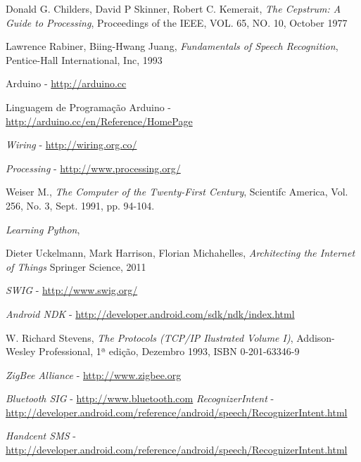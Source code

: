 \documentclass[12pt,a4paper,oneside]{report}
\begin{document}
\begin{thebibliography}{99}
	Donald G. Childers, David P Skinner, Robert C. Kemerait,
	\emph{The Cepstrum: A Guide to Processing}, 
	Proceedings of the IEEE, VOL. 65, NO. 10, October 1977

	Lawrence Rabiner, Biing-Hwang Juang,
	\emph{Fundamentals of Speech Recognition},
	Pentice-Hall International, Inc, 1993

	Arduino - \url{http://arduino.cc}
    
	Linguagem de Programação Arduino - \url{http://arduino.cc/en/Reference/HomePage}

	\emph{Wiring} - \url{http://wiring.org.co/}

	\emph{Processing} - \url{http://www.processing.org/}

	Weiser M.,
	\emph{The Computer of the Twenty-First Century},
	Scientifc America, Vol. 256, No. 3, Sept. 1991, pp. 94-104.

	\emph{Learning Python},
	
	Dieter Uckelmann, Mark Harrison, Florian Michahelles,
	\emph{Architecting the Internet of Things}
	Springer Science, 2011

	\emph{SWIG} - \url{http://www.swig.org/}

	\emph{Android NDK} - \url{http://developer.android.com/sdk/ndk/index.html}

	W. Richard Stevens,
	\emph{The Protocols (TCP/IP Ilustrated Volume I)},
	Addison-Wesley Professional, 1ª edição, Dezembro 1993, ISBN 0-201-63346-9

	\emph{ZigBee Alliance} - \url{http://www.zigbee.org}

	\emph{Bluetooth SIG} - \url{http://www.bluetooth.com}
	\emph{RecognizerIntent} - \url{http://developer.android.com/reference/android/speech/RecognizerIntent.html}

	\emph{Handcent SMS} - \url{http://developer.android.com/reference/android/speech/RecognizerIntent.html}
\end{thebibliography}
\end{document}
